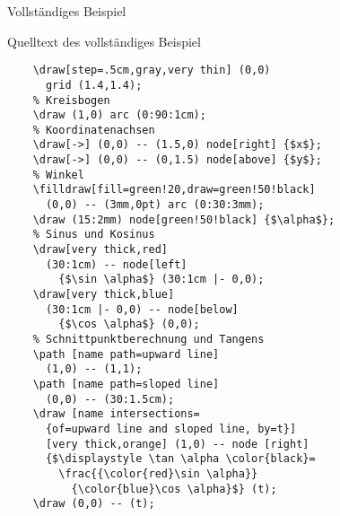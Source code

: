 \begin{Frame}[fragile]{Vollständiges Beispiel}
\end{Frame}

\begin{Frame}{Quelltext des vollständiges Beispiel}
  \begin{lstlisting}[gobble=4]
    % Gitter im Hintergrund
    \draw[step=.5cm,gray,very thin] (0,0)
      grid (1.4,1.4);
    % Kreisbogen
    \draw (1,0) arc (0:90:1cm);
    % Koordinatenachsen
    \draw[->] (0,0) -- (1.5,0) node[right] {$x$};
    \draw[->] (0,0) -- (0,1.5) node[above] {$y$};
    % Winkel
    \filldraw[fill=green!20,draw=green!50!black]
      (0,0) -- (3mm,0pt) arc (0:30:3mm);
    \draw (15:2mm) node[green!50!black] {$\alpha$};
    % Sinus und Kosinus
    \draw[very thick,red]
      (30:1cm) -- node[left]
        {$\sin \alpha$} (30:1cm |- 0,0);
    \draw[very thick,blue]
      (30:1cm |- 0,0) -- node[below]
        {$\cos \alpha$} (0,0);
    % Schnittpunktberechnung und Tangens
    \path [name path=upward line]
      (1,0) -- (1,1);
    \path [name path=sloped line]
      (0,0) -- (30:1.5cm);
    \draw [name intersections=
      {of=upward line and sloped line, by=t}]
      [very thick,orange] (1,0) -- node [right]
      {$\displaystyle \tan \alpha \color{black}=
        \frac{{\color{red}\sin \alpha}}
          {\color{blue}\cos \alpha}$} (t);
    \draw (0,0) -- (t);
  \end{lstlisting}
\end{Frame}


